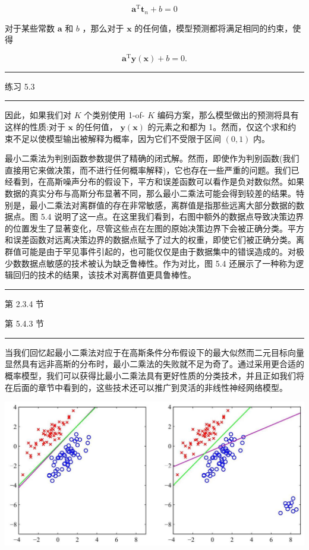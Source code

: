 \documentclass[10pt]{report}
\newcommand{\HRule}{\begin{center}\rule{0.9\linewidth}{0.2mm}\end{center}}
\begin{document}
\[
{\mathbf{a}}^{\mathrm{T}}{\mathbf{t}}_{n} + b = 0 \tag{5.17}
\]

对于某些常数 \(\mathbf{a}\) 和 \(b\) ，那么对于 \(\mathbf{x}\) 的任何值，模型预测都将满足相同的约束，使得

\[
{\mathbf{a}}^{\mathrm{T}}\mathbf{y}\left( \mathbf{x}\right)  + b = 0. \tag{5.18}
\]

\HRule

练习 5.3

\HRule

因此，如果我们对 \(K\) 个类别使用 1-of- \(K\) 编码方案，那么模型做出的预测将具有这样的性质:对于 \(\mathbf{x}\) 的任何值， \(\mathbf{y}\left( \mathbf{x}\right)\) 的元素之和都为 1。然而，仅这个求和约束不足以使模型输出被解释为概率，因为它们不受限于区间 \(\left( {0,1}\right)\) 内。

最小二乘法为判别函数参数提供了精确的闭式解。然而，即使作为判别函数(我们直接用它来做决策，而不进行任何概率解释)，它也存在一些严重的问题。我们已经看到，在高斯噪声分布的假设下，平方和误差函数可以看作是负对数似然。如果数据的真实分布与高斯分布显著不同，那么最小二乘法可能会得到较差的结果。特别是，最小二乘法对离群值的存在非常敏感，离群值是指那些远离大部分数据的数据点。图 5.4 说明了这一点。在这里我们看到，右图中额外的数据点导致决策边界的位置发生了显著变化，尽管这些点在左图的原始决策边界下会被正确分类。平方和误差函数对远离决策边界的数据点赋予了过大的权重，即使它们被正确分类。离群值可能是由于罕见事件引起的，也可能仅仅是由于数据集中的错误造成的。对极少数数据点敏感的技术被认为缺乏鲁棒性。作为对比，图 5.4 还展示了一种称为逻辑回归的技术的结果，该技术对离群值更具鲁棒性。

\HRule

第 2.3.4 节

第 5.4.3 节

\HRule

当我们回忆起最小二乘法对应于在高斯条件分布假设下的最大似然而二元目标向量显然具有远非高斯的分布时，最小二乘法的失败就不足为奇了。通过采用更合适的概率模型，我们可以获得比最小二乘法具有更好性质的分类技术，并且正如我们将在后面的章节中看到的，这些技术还可以推广到灵活的非线性神经网络模型。

\begin{center}
\includegraphics[max width=1.0\textwidth]{images/0194e279-9b28-703a-88f4-c3ac21e2010d_157_231_365_1293_621_0.jpg}
\end{center}
\hspace*{3em} 
\end{document}
